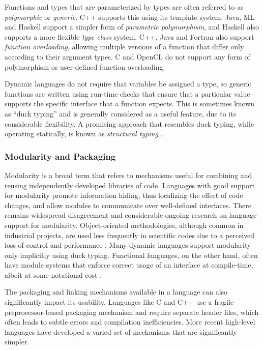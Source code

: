Functions and types that are parameterized by types are often referred to as {\it polymorphic} or {\it generic}. C++ supports this using its template system. Java, ML and Haskell support a simpler form of {\it parametric polymorphism}, and Haskell also supports a more flexible {\it type class} system. C++, Java and Fortran also support {\it function overloading}, allowing multiple versions of a function that differ only according to their argument types. C and OpenCL do not support any form of polymorphism or user-defined function overloading.

Dynamic languages do not require that variables be assigned a type, so generic functions are written using run-time checks that ensure that a particular value supports the specific interface that a function expects. This is sometimes known as ``duck typing'' and is generally considered as a useful feature, due to its considerable flexibility. A promising approach that resembles duck typing, while operating statically, is known as {\it structural typing} \cite{malayeri2009structural}.

\subsubsection{Modularity and Packaging}\label{modularity}
Modularity is a broad term that refers to mechanisms useful for combining and reusing independently developed libraries of code. Languages with good support for modularity promote information hiding, thus localizing the effect of code changes, and allow modules to communicate over well-defined interfaces. There remains widespread disagreement and considerable ongoing research on language support for modularity. Object-oriented methodologies, although common in industrial projects, are used less frequently in scientific codes due to a perceived loss of control and performance \cite{basili2008understanding}. Many dynamic languages support modularity only implicitly using duck typing. Functional languages, on the other hand, often have module systems that enforce correct usage of an interface at compile-time, albeit at some notational cost \cite{tapl}.

The packaging and linking mechanisms available in a language can also significantly impact its usability. Languages like C and C++ use a fragile preprocessor-based packaging mechanism and require separate header files, which often leads to subtle errors and compilation inefficiencies. More recent high-level languages have developed a varied set of mechanisms that are significantly simpler.

